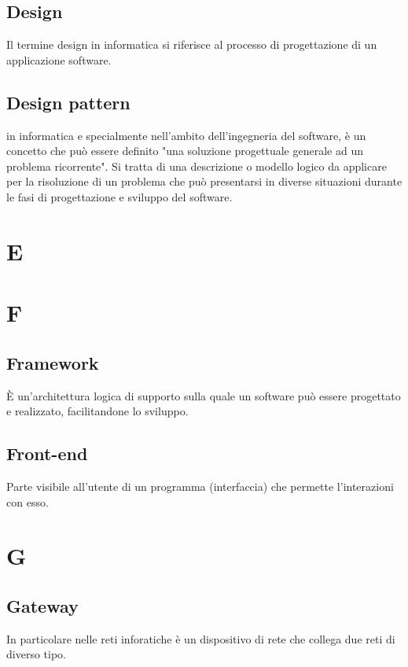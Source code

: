 \documentclass{classes/base}
\begin{document}
        \subsection*{Design}
        Il termine design in informatica si riferisce al processo di progettazione di un applicazione software.

        \subsection*{Design pattern}
        in informatica e specialmente nell'ambito dell'ingegneria del software, è un concetto che può essere definito "una soluzione progettuale generale ad un problema ricorrente".
        Si tratta di una descrizione o modello logico da applicare per la risoluzione di un problema che può presentarsi in diverse situazioni durante le fasi di progettazione e sviluppo del software.

        \newpage  
    \section{E}
    
        \newpage  
    \section{F}
        \subsection*{Framework}
        È un'architettura logica di supporto sulla quale un software può essere progettato e realizzato, facilitandone lo sviluppo.
        
        \subsection*{Front-end}
        Parte visibile all'utente di un programma (interfaccia) che permette l'interazioni con esso.
        
        \newpage  
    \section{G}
        
        \subsection*{Gateway}
        In particolare nelle reti inforatiche è un dispositivo di rete che collega due reti di diverso tipo.
\end{document}
